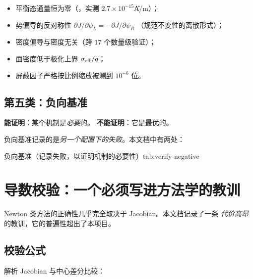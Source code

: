 \begin{itemize}[leftmargin=1.7em,itemsep=0.28em,topsep=0.35em]
  \item 平衡态通量恒为零（，实测 $2.7\times10^{-15}$\U{A/m}）；
  \item 势偏导的反对称性 $\partial J/\partial\psi_L=-\partial J/\partial\psi_R$
        （规范不变性的离散形式）；
  \item 密度偏导与密度无关（跨 $17$ 个数量级验证）；
  \item 面密度低于极化上界 $\sigma_{\mathrm{eff}}/q$；
  \item 屏蔽因子严格按比例缩放被测到 $10^{-6}$ 位。
\end{itemize}

\subsection{第五类：负向基准}
\label{sec:verify-negative}

\textbf{能证明}：某个机制是\emph{必要}的。
\textbf{不能证明}：它是最优的。

负向基准记录的是\emph{另一个配置下的失败}。本文档中有两处：

\begin{veriftable}{负向基准（记录失败，以证明机制的必要性）}{tab:verify-negative}
\end{veriftable}

\section{导数校验：一个必须写进方法学的教训}
\label{sec:verify-jacobian}

Newton 类方法的正确性几乎完全取决于 Jacobian。本文档记录了一条
\emph{代价高昂}的教训，它的普遍性超出了本项目。

\subsection{校验公式}

解析 Jacobian 与中心差分比较：

